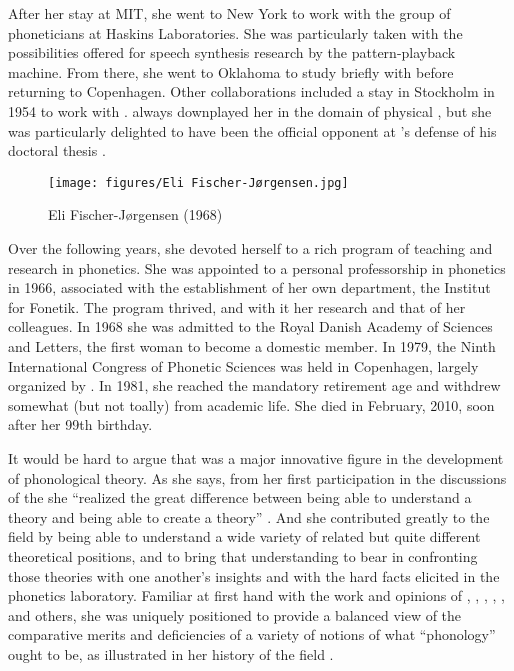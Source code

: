 After her stay at MIT, she went to New York to work with the group of
phoneticians at Haskins Laboratories. She was particularly taken with
the possibilities offered for speech synthesis research by the
pattern-playback machine. From there, she went to Oklahoma to study
briefly with  before returning to Copenhagen. Other
collaborations included a stay in Stockholm in 1954 to work with
. {\Eli} always downplayed her  in the domain of
physical , but she was particularly delighted to have been
the official opponent at {\Fant}'s defense of his doctoral thesis
\citep{fant60:acoustic.theory}.

\begin{wrapfigure}[16]{l}{.35\textwidth}
 \texttt{[image: figures/Eli Fischer-Jørgensen.jpg]}
  \caption{Eli Fischer-Jørgensen (1968)}
 \label{fig:ch.hjelmslev.efj}
\end{wrapfigure}
Over the following years, she devoted herself to a rich program of
teaching and research in phonetics. She was appointed to a personal
professorship in phonetics in 1966, associated with the establishment
of her own department, the Institut for Fonetik. The program thrived,
and with it her research and that of her colleagues. In 1968 she was
admitted to the Royal {Danish} Academy of Sciences and Letters, the
first woman to become a domestic member.  In 1979, the Ninth
International Congress of Phonetic Sciences was held in Copenhagen,
largely organized by {\Eli}. In 1981, she reached the mandatory
retirement age and withdrew somewhat (but not toally) from academic
life. She died in February, 2010, soon after her 99th birthday.

It would be hard to argue that  was a major
innovative figure in the development of phonological theory. As she
says, from her first participation in the discussions of the
 she ``realized the great difference
between being able to understand a theory and being able to create a
theory'' \citep[63]{fischer-jorgensen81:causerie}. And she contributed
greatly to the field by being able to understand a wide variety of
related but quite different theoretical positions, and to bring that
understanding to bear in confronting those theories with one another's
insights and with the hard facts elicited in the phonetics
laboratory. Familiar at first hand with the work and opinions of
{\Hjelmslev}, {\Jakobson}, {\Martinet}, {\Jones}, {\Firth}, {\Pike} and others, she was
uniquely positioned to provide a balanced view of the comparative
merits and deficiencies of a variety of notions of what ``phonology''
ought to be, as illustrated in her history of the field
\citep{fischer-jorgensen75:trends}.


